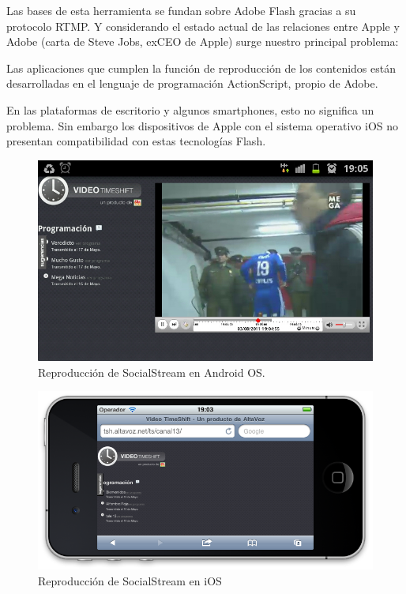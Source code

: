 Las bases de esta herramienta se fundan sobre Adobe Flash gracias a su protocolo RTMP. Y considerando el estado actual de las relaciones entre Apple y Adobe (carta de Steve Jobs, exCEO de Apple) surge nuestro principal problema:

	Las aplicaciones que cumplen la función de reproducción de los contenidos están desarrolladas en el lenguaje de programación ActionScript, propio de Adobe.

En las plataformas de escritorio y algunos smartphones, esto no significa un problema. Sin embargo los dispositivos de Apple con el sistema operativo iOS no presentan compatibilidad con estas tecnologías Flash.

\clearpage 
\begin{figure}[h!]
	\centering
	 \includegraphics[scale=0.47]{imgs/sshot_Android_sstream.jpg}
 	\caption{Reproducción de SocialStream en Android OS.}
 	\label{sshot_Android_sstream}
\end{figure}
\begin{figure}[h!]
	\centering
	\includegraphics[scale=0.55]{imgs/sshot_iOS_sstream.png}
	\caption{Reproducción de SocialStream en iOS}
	\label{sshot_iOS_sstream}
\end{figure}

